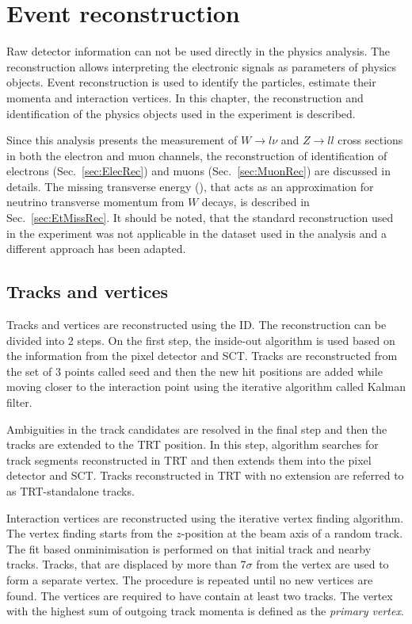 \chapter{Event reconstruction}\label{chap:Rec}
\minitoc
Raw detector information can not be used directly in the physics analysis. The reconstruction allows interpreting the electronic signals as parameters of physics objects. Event reconstruction is used to identify the particles, estimate their momenta and interaction vertices. In this chapter, the reconstruction and identification of the physics objects used in the \atlas experiment is described. 

Since this analysis presents the measurement of $W\to l\nu$ and $Z \to ll$ cross sections in both the electron and muon channels, the reconstruction of identification of electrons (Sec.~\ref{sec:ElecRec}) and muons (Sec.~\ref{sec:MuonRec}) are discussed in details. The missing transverse energy (\etmiss), that acts as an approximation for neutrino transverse momentum from $W$ decays, is described in Sec.~\ref{sec:EtMissRec}. It should be noted, that the standard \etmiss reconstruction used in the \atlas experiment was not applicable in the dataset used in the analysis and a different approach has been adapted.

\section{Tracks and vertices}

Tracks and vertices are reconstructed using the ID\cite{Track}. The reconstruction can be divided into 2 steps. 
On the first step, the inside-out algorithm is used based on the information from the pixel detector and SCT. Tracks are reconstructed from the set of 3 points called seed and then the new hit positions are added while moving closer to the interaction point using the iterative algorithm called Kalman filter\cite{Kalman}.  

Ambiguities in the track candidates are resolved in the final step and then the tracks are extended to the TRT position. In this step, algorithm searches for track segments reconstructed in TRT and then extends them into the pixel detector and SCT. Tracks reconstructed in TRT with no extension are referred to as TRT-standalone tracks. 

Interaction vertices are reconstructed using the iterative vertex finding algorithm. The vertex finding starts from the $z$-position at the beam axis of a random track. The fit based on\chiD minimisation is performed on that initial track and nearby tracks. Tracks, that are displaced by more than 7$\sigma$ from the vertex are used to form a separate vertex. The procedure is repeated until no new vertices are found.  The vertices are required to have contain at least two tracks. The  vertex with the highest sum of outgoing track momenta is defined as the \textit{primary vertex}.

